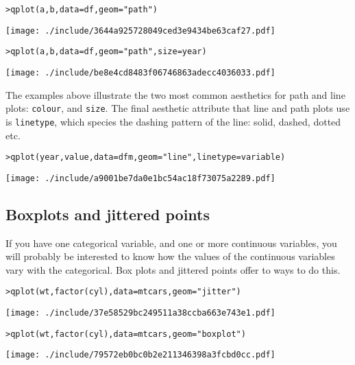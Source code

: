 \begin{alltt}
> qplot(a, b, data = df, geom = "path")
\end{alltt}
\texttt{[image: ./include/3644a925728049ced3e9434be63caf27.pdf]}
\begin{alltt}

> qplot(a, b, data = df, geom = "path", size = year)
\end{alltt}
\texttt{[image: ./include/be8e4cd8483f06746863adecc4036033.pdf]}
\begin{alltt}

\end{alltt}

The examples above illustrate the two most common aesthetics for path and line plots: {\tt colour}, and {\tt size}.  The final aesthetic attribute that line and path plots use is {\tt linetype}, which species the dashing pattern of the line: solid, dashed, dotted etc.

\begin{alltt}
> qplot(year, value, data = dfm, geom = "line", linetype = variable)
\end{alltt}
\texttt{[image: ./include/a9001be7da0e1bc54ac18f73075a2289.pdf]}
\begin{alltt}

\end{alltt}



\subsection{Boxplots and jittered points}\label{sub:boxplot}

If you have one categorical variable, and one or more continuous variables, you will probably be interested to know how the values of the continuous variables vary with the categorical.  Box plots and jittered points offer to ways to do this.  

\begin{alltt}
> qplot(wt, factor(cyl), data = mtcars, geom = "jitter")
\end{alltt}
\texttt{[image: ./include/37e58529bc249511a38ccba663e743e1.pdf]}
\begin{alltt}

> qplot(wt, factor(cyl), data = mtcars, geom = "boxplot")
\end{alltt}
\texttt{[image: ./include/79572eb0bc0b2e211346398a3fcbd0cc.pdf]}
\begin{alltt}

\end{alltt}

